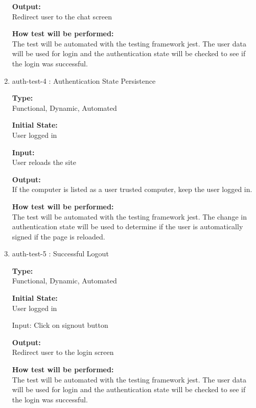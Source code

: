 \documentclass[12pt, titlepage]{article}
\begin{document}
\begin{enumerate}
\textbf{Output:}\\ Redirect user to the chat screen
					
\textbf{How test will be performed:}\\ 
The test will be automated with the testing framework jest. The user data will be used for login and the authentication state will be checked to see if the login was successful.

\item{auth-test-4 : Authentication State Persistence\\}

\textbf{Type:}\\ Functional, Dynamic, Automated 
					
\textbf{Initial State:}\\ User logged in
					
\textbf{Input:}\\ User reloads the site
					
\textbf{Output:}\\ If the computer is listed as a user trusted computer, keep the user logged in.
					
\textbf{How test will be performed:}\\ 
The test will be automated with the testing framework jest. The change in authentication state will be used to determine if the user is automatically signed if the page is reloaded.

\item{auth-test-5 : Successful Logout\\}

\textbf{Type:}\\ Functional, Dynamic, Automated 
					
\textbf{Initial State:}\\ User logged in
					
Input: Click on signout button
					
\textbf{Output:}\\ Redirect user to the login screen
					
\textbf{How test will be performed:}\\ 
The test will be automated with the testing framework jest. The user data will be used for login and the authentication state will be checked to see if the login was successful.


\end{enumerate} 
\end{document}
